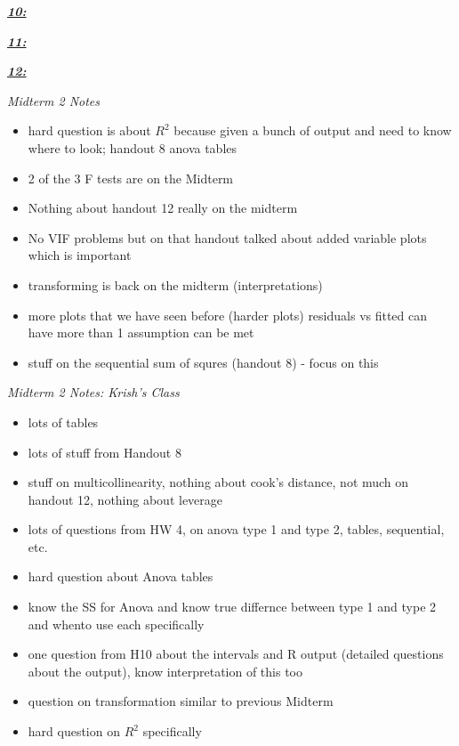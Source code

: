 \documentclass[8pt]{extarticle}
\begin{document}
\textit{\textbf{\underline{10:}}}


\textit{\textbf{\underline{11:}}}

\textit{\textbf{\underline{12:}}}

\textit{Midterm 2 Notes}
\begin{itemize}
    \item hard question is about $R^2$ because given a bunch of output and need 
    to know where to look; handout 8 anova tables
    \item 2 of the 3 F tests are on the Midterm
    \item Nothing about handout 12 really on the midterm
    \item No VIF problems but on that handout talked about added variable plots
    which is important
    \item transforming is back on the midterm (interpretations)
    \item more plots that we have seen before (harder plots) residuals vs fitted
    can have more than 1 assumption can be met
    \item stuff on the sequential sum of squres (handout 8) - focus on this
\end{itemize}

\textit{Midterm 2 Notes: Krish's Class}
\begin{itemize}
    \item lots of tables
    \item lots of stuff from Handout 8
    \item stuff on multicollinearity, nothing about cook's distance, not much on
    handout 12, nothing about leverage
    \item lots of questions from HW 4, on anova type 1 and type 2, tables, 
    sequential, etc.
    \item hard question about Anova tables
    \item know the SS for Anova and know true differnce between type 1 and type 
    2 and whento use each specifically
    \item one question from H10 about the intervals and R output (detailed 
    questions about the output), know interpretation of this too
    \item question on transformation similar to previous Midterm
    \item hard question on $R^2$ specifically
\end{itemize}
\end{document}
